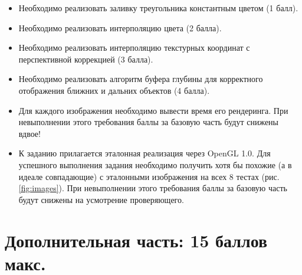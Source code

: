 \documentclass[12pt,subf,href,colorlinks=true]{article}
\begin{document}
\begin{itemize}
  \item Необходимо реализовать заливку треугольника константным цветом (1 балл).
  \item Необходимо реализовать интерполяцию цвета (2 балла).
  \item Необходимо реализовать интерполяцию текстурных координат с перспективной коррекцией (3 балла).
  \item Необходимо реализовать алгоритм буфера глубины для корректного отображения ближних и дальних объектов (4 балла).
  \item Для каждого изображения необходимо вывести время его рендеринга. При невыполнении этого требования баллы за базовую часть будут снижены вдвое!
  \item К заданию прилагается эталонная реализация через OpenGL 1.0. Для успешного выполнения задания необходимо получить хотя бы похожие (а в идеале совпадающие) с эталонными изображения на всех 8 тестах (рис. \ref{fig:images}). При невыполнении этого требования баллы за базовую часть будут снижены на усмотрение проверяющего.
\end{itemize}

\section{Дополнительная часть: 15 баллов макс.}
\end{document}
